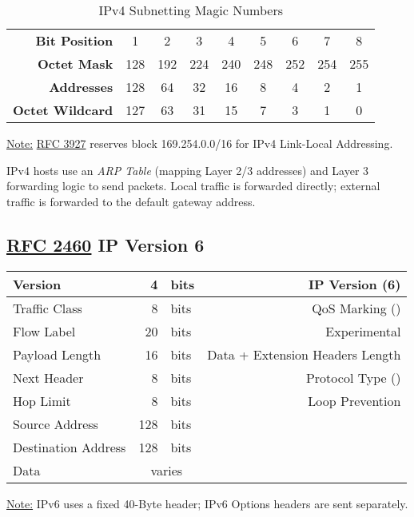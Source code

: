 \documentclass[12pt]{article}
\newif\ifcolor											%
\newcommand{\note}[1]{\ifcolor \colorbox{#1}{Note:}\else \underline{Note:}\fi}
\newcommand{\RFC}[1]{\href{https://datatracker.ietf.org/doc/html/rfc#1}{RFC #1}}
\newcommand{\mc}[3]{\multicolumn{#1}{#2}{#3}}
\begin{document}
	\begin{table}[H]
	\centering
	\caption{IPv4 Subnetting Magic Numbers \label{tab:SUBNETTING}}
	\begin{tabular}{@{} r | c c c c c c c c @{}}\hline
	\textbf{Bit Position}	& 1	& 2	& 3	& 4	& 5	& 6	& 7 & 8\\
	\textbf{Octet Mask}	& 128 & 192 & 224 & 240 & 248 & 252 & 254 & 255\\
	\textbf{Addresses}	& 128	& 64	& 32	& 16	& 8	& 4	& 2	& 1\\
	\textbf{Octet Wildcard}	& 127	& 63	& 31 	& 15	& 7	& 3	& 1	& 0\\\hline
	\end{tabular}\end{table}
	\note{Goldenrod} \RFC{3927} reserves block 169.254.0.0/16 for IPv4 Link-Local Addressing.

	IPv4 hosts use an \textit{ARP Table} (mapping Layer 2/3 addresses) and Layer 3 forwarding logic to send packets. Local traffic is forwarded directly; external traffic is forwarded to the default gateway address.


	\subsection[RFC 2460 IPv6]{\RFC{2460} IP Version 6 \label{subsec:IPV6}}
	\begin{table}[H]
	\centering
	\begin{tabular}{| l | r @{ } l | r |}\hline
	Version			& 4		& bits	& IP Version (6)\\\hline
	Traffic Class			& 8		& bits	& QoS Marking (\Cref{sec:QOS})\\\hline
	Flow Label			& 20		& bits	& Experimental\\\hline
	Payload Length		& 16		& bits	& Data + Extension Headers Length\\\hline
	Next Header		& 8		& bits	& Protocol Type (\Cref{tab:L3 PROTOCOL})\\\hline
	Hop Limit			& 8		& bits	& Loop Prevention\\\hline
	Source Address		& 128		& bits	&\\\hline
	Destination Address	& 128		& bits	&\\\hline
	Data				& \mc{2}{c|}{varies}	&\\\hline
	\end{tabular}\end{table}
	\note{Goldenrod} IPv6 uses a fixed 40-Byte header; IPv6 Options headers are sent separately.
\end{document}
